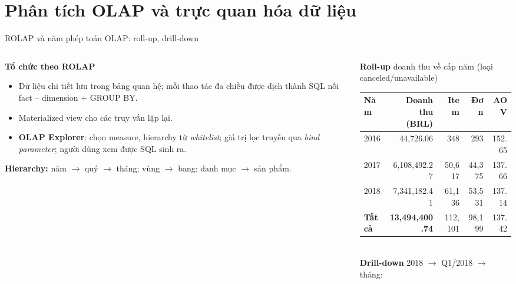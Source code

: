\documentclass[aspectratio=169,10pt,xcolor=table]{beamer}
\newcommand{\presenter}{}
\newcommand{\setpresenter}[1]{\renewcommand{\presenter}{#1}}
\begin{document}
\setpresenter{Phan Huy Quang Minh}
\section{Phân tích OLAP và trực quan hóa dữ liệu}

\begin{frame}{ROLAP và năm phép toán OLAP: roll-up, drill-down}
  \begin{columns}[T]
    \begin{column}{0.44\textwidth}
      \footnotesize
      \textbf{Tổ chức theo ROLAP}
      \begin{itemize}
        \item Dữ liệu chi tiết lưu trong bảng quan hệ; mỗi thao tác đa chiều được dịch thành SQL nối fact -- dimension + GROUP BY.
        \item Materialized view cho các truy vấn lặp lại.
        \item \textbf{OLAP Explorer}: chọn measure, hierarchy từ \emph{whitelist}; giá trị lọc truyền qua \emph{bind parameter}; người dùng xem được SQL sinh ra.
      \end{itemize}
      \vspace{0.1cm}
      \textbf{Hierarchy:} năm $\to$ quý $\to$ tháng;\; vùng $\to$ bang;\; danh mục $\to$ sản phẩm.
    \end{column}
    \begin{column}{0.53\textwidth}
      \footnotesize
      \textbf{Roll-up} doanh thu về cấp năm (loại canceled/unavailable)\\[0.1cm]
      \begin{tabular}{@{}lrrrr@{}}
        \toprule
        Năm & Doanh thu (BRL) & Item & Đơn & AOV\\
        \midrule
        2016 & 44,726.06 & 348 & 293 & 152.65\\
        2017 & 6,108,492.27 & 50,617 & 44,375 & 137.66\\
        2018 & 7,341,182.41 & 61,136 & 53,531 & 137.14\\
        \midrule
        \textbf{Tất cả} & \textbf{13,494,400.74} & 112,101 & 98,199 & 137.42\\
        \bottomrule
      \end{tabular}\\[0.25cm]
      \textbf{Drill-down} 2018 $\to$ Q1/2018 $\to$ tháng:\\[0.05cm]

\end{column}
\end{columns}
\end{frame}
\end{document}
